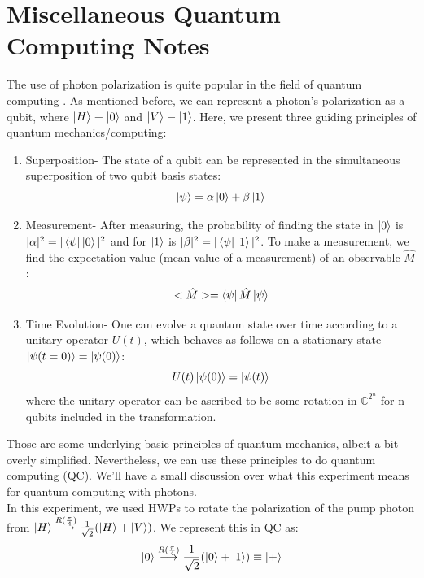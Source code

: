 \documentclass{article}
\begin{document}
\section{Miscellaneous Quantum Computing Notes}
    The use of photon polarization is quite popular in the field of quantum computing \cite{vaz}. As mentioned before, we can represent a photon's polarization as a qubit, where $\left\vert{H}\right\rangle\equiv\left\vert{0}\right\rangle$ and $\left\vert{V}\right\rangle\equiv\left\vert{1}\right\rangle$. Here, we present three guiding principles of quantum mechanics/computing:
    \begin{enumerate}
        \item Superposition- The state of a qubit can be represented in the simultaneous superposition of two qubit basis states:
        \begin{equation}
            \left\vert{\psi}\right\rangle = \alpha \left\vert{0}\right\rangle + \beta \left\vert{1}\right\rangle
        \end{equation}
        \item Measurement- After measuring, the probability of finding the state in $\left\vert{0}\right\rangle$ is $|\alpha|^2 = |\left\langle{\psi}\right\vert\left\vert{0}\right\rangle|^2$  and for $\left\vert{1}\right\rangle$ is $|\beta|^2 = |\left\langle{\psi}\right\vert\left\vert{1}\right\rangle|^2$. To make a measurement, we find the expectation value (mean value of a measurement) of an observable $\hat{M}$: 
        \begin{equation}
            <\hat{M}> = \left\langle{\psi}\right\vert\hat{M}\left\vert{\psi}\right\rangle
        \end{equation}
        \item Time Evolution- One can evolve a quantum state over time according to a unitary operator $U(t)$, which behaves as follows on a stationary state $\left\vert{\psi(t=0)}\right\rangle = \left\vert{\psi(0)}\right\rangle$:
        \begin{equation}
            U(t)\left\vert{\psi(0)}\right\rangle = \left\vert{\psi(t)}\right\rangle
        \end{equation}
        where the unitary operator can be ascribed to be some rotation in $\mathbb{C}^{2^n}$ for n qubits included in the transformation.
    \end{enumerate}
    Those are some underlying basic principles of quantum mechanics, albeit a bit overly simplified. Nevertheless, we can use these principles to do quantum computing (QC). We'll have a small discussion over what this experiment means for quantum computing with photons.
    \\\indent In this experiment, we used HWPs to rotate the polarization of the pump photon from $\left\vert{H}\right\rangle\overset{R(\frac{\pi}{4})}{\longrightarrow}\frac{1}{\sqrt{2}}(\left\vert{H}\right\rangle+\left\vert{V}\right\rangle)$. We represent this in QC as:
    \begin{equation}
        \left\vert{0}\right\rangle\overset{R(\frac{\pi}{4})}{\longrightarrow}\frac{1}{\sqrt{2}}(\left\vert{0}\right\rangle+\left\vert{1}\right\rangle) \equiv \left\vert{+}\right\rangle
    \end{equation}
\end{document}
